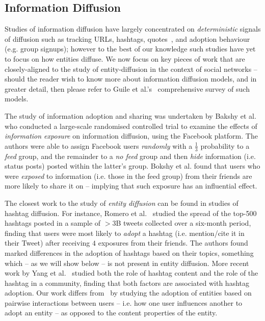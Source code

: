 \documentclass[sigconf,anonymous,review]{acmart}
\begin{document}
\subsection{Information Diffusion}
Studies of information diffusion have largely concentrated on \emph{deterministic} signals of diffusion such as tracking URLs, hashtags, quotes~\cite{suen2013nifty}, and adoption behaviour (e.g. group signups); however to the best of our knowledge such studies have yet to focus on how entities diffuse.
We now focus on key pieces of work that are closely-aligned to the study of entity-diffusion in the context of social networks -- should the reader wish to know more about information diffusion models, and in greater detail, then please refer to Guile et al.'s~\cite{guille2013information} comprehensive survey of such models.

The study of information adoption and sharing was undertaken by Bakshy et al.~\cite{bakshy2012role} who conducted a large-scale randomised controlled trial to examine the effects of \emph{information exposure} on information diffusion, using the Facebook platform.
The authors were able to assign Facebook users \emph{randomly} with a $\frac{1}{3}$ probability to a \emph{feed} group, and the remainder to a \emph{no feed} group and then \emph{hide} information (i.e. status posts) posted within the latter's group.
Bokshy et al. found that users who were \emph{exposed} to information (i.e. those in the feed group) from their friends are more likely to share it on -- implying that such exposure has an influential effect.

The closest work to the study of \emph{entity diffusion} can be found in studies of hashtag diffusion.
For instance, Romero et al.~\cite{romero2011differences} studied the spread of the top-500 hashtags posted in a sample of $>3$B tweets collected over a six-month period, finding that users were most likely to \emph{adopt} a hashtag (i.e. mention/cite it in their Tweet) after receiving $4$ exposures from their friends.
The authors found marked differences in the adoption of hashtags based on their topics, something which -- as we will show below -- is not present in entity diffusion.
More recent work by Yang et al.~\cite{yang2012we} studied both the role of hashtag content and the role of the hashtag in a community, finding that both factors are associated with hashtag adoption.
Our work differs from~\cite{yang2012we} by studying the adoption of entities based on pairwise interactions between users -- i.e. how one user influences another to adopt an entity -- as opposed to the content properties of the entity.
\end{document}
